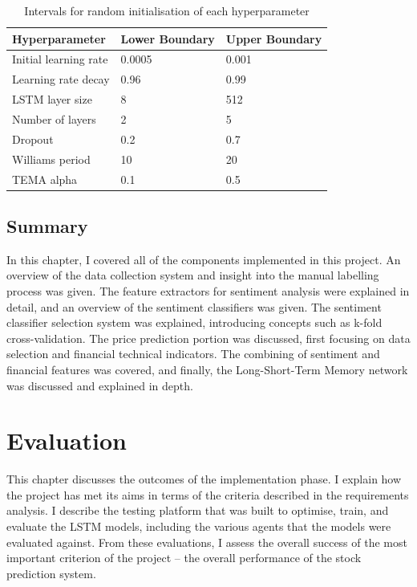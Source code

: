 \documentclass[12pt,a4paper,twoside,openright]{report}
\begin{document}
\begin{table}[H]
\centering
\begin{tabular}{p{5.5cm} p{4cm} p{4cm}}
\toprule
\textbf{Hyperparameter}															   & \textbf{Lower Boundary} & \textbf{Upper Boundary} \bigstrut\\ \midrule
Initial learning rate                                                          & 0.0005 & 0.001  \bigstrut\\
Learning rate decay                                                            & 0.96   & 0.99   \bigstrut\\
LSTM layer size                                                                & 8      & 512    \bigstrut\\
Number of layers                                                               & 2      & 5      \bigstrut\\
Dropout                                                                        & 0.2    & 0.7    \bigstrut\\
Williams period                                                                & 10     & 20     \bigstrut\\
TEMA alpha                                                                      & 0.1    & 0.5   \bigstrut\\ \bottomrule
\end{tabular}
\caption{Intervals for random initialisation of each hyperparameter}
\label{table:hypers}
\end{table}

\section{Summary}

In this chapter, I covered all of the components implemented in this project. An overview
of the data collection system and insight into the manual labelling process was given. 
The feature extractors for sentiment analysis were explained in detail, and an overview of the sentiment 
classifiers was given. The sentiment classifier selection system was explained, introducing concepts
such as k-fold cross-validation. The price prediction portion was discussed, first focusing on
data selection and financial technical indicators. The combining of sentiment and financial features
was covered, and finally, the Long-Short-Term Memory network was discussed and explained in depth.

\chapter{Evaluation}
This chapter discusses the outcomes of the implementation phase. I explain
how the project has met its aims in terms of the criteria described in the
requirements analysis. I describe the testing platform that was built to optimise,
train, and evaluate the LSTM models, including the various agents that the models
were evaluated against. From these evaluations, I assess the overall success of the
most important criterion of the project -- the overall performance of the stock
prediction system.
\end{document}
